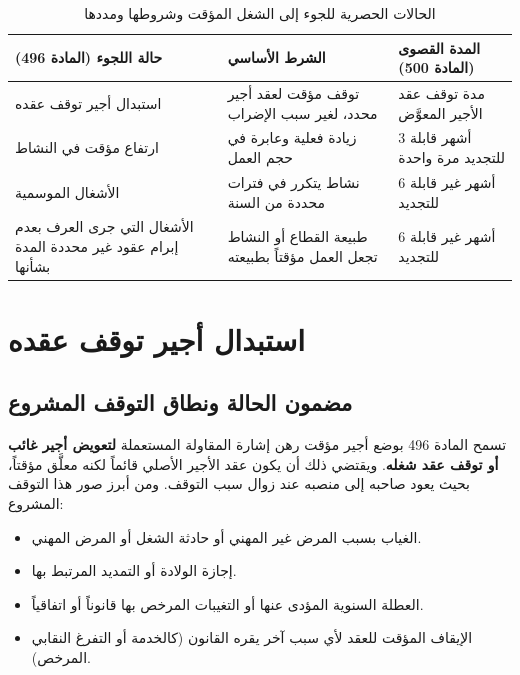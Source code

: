 \begin{table}[htbp]
\centering
\small
\renewcommand{\arraystretch}{1.5}
\begin{tabular}{|p{4.4cm}|p{4.6cm}|p{4.4cm}|}
\hline
\textbf{حالة اللجوء (المادة \textenglish{496})} & \textbf{الشرط الأساسي} & \textbf{المدة القصوى (المادة \textenglish{500})} \\
\hline
استبدال أجير توقف عقده & توقف مؤقت لعقد أجير محدد، لغير سبب الإضراب & مدة توقف عقد الأجير المعوَّض \\
\hline
ارتفاع مؤقت في النشاط & زيادة فعلية وعابرة في حجم العمل & \textenglish{3} أشهر قابلة للتجديد مرة واحدة \\
\hline
الأشغال الموسمية & نشاط يتكرر في فترات محددة من السنة & \textenglish{6} أشهر غير قابلة للتجديد \\
\hline
الأشغال التي جرى العرف بعدم إبرام عقود غير محددة المدة بشأنها & طبيعة القطاع أو النشاط تجعل العمل مؤقتاً بطبيعته & \textenglish{6} أشهر غير قابلة للتجديد \\
\hline
\end{tabular}
\caption{الحالات الحصرية للجوء إلى الشغل المؤقت وشروطها ومددها}
\label{tab:cas-recours}
\end{table}

\section{استبدال أجير توقف عقده}

\subsection{مضمون الحالة ونطاق التوقف المشروع}
تسمح المادة \textenglish{496} بوضع أجير مؤقت رهن إشارة المقاولة المستعملة \textbf{لتعويض أجير غائب أو توقف عقد شغله}. ويقتضي ذلك أن يكون عقد الأجير الأصلي قائماً لكنه معلَّق مؤقتاً، بحيث يعود صاحبه إلى منصبه عند زوال سبب التوقف. ومن أبرز صور هذا التوقف المشروع:
\begin{itemize}[leftmargin=*, itemsep=4pt]
    \item الغياب بسبب المرض غير المهني أو حادثة الشغل أو المرض المهني.
    \item إجازة الولادة أو التمديد المرتبط بها.
    \item العطلة السنوية المؤدى عنها أو التغيبات المرخص بها قانوناً أو اتفاقياً.
    \item الإيقاف المؤقت للعقد لأي سبب آخر يقره القانون (كالخدمة أو التفرغ النقابي المرخص).
\end{itemize}

